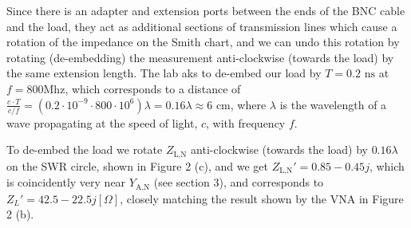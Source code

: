 \documentclass[10pt]{article}
\begin{document}
Since there is an adapter and extension ports between the ends of the BNC cable and the load, they act as 
additional sections of transmission lines which cause a rotation of the impedance on the Smith chart, and 
we can undo this rotation by rotating (de-embedding) the measurement anti-clockwise (towards the load) by the same 
extension length. The lab aks to de-embed our load by $T = 0.2 \text{ ns}$ at $f=800\text{Mhz}$, which corresponds 
to a distance of $\frac{c\cdot T}{c/f} = (0.2\cdot10^{-9}\cdot 800\cdot 10^{6}) \lambda = 0.16\lambda \approx 6\text{ cm}$, 
where $\lambda$ is the wavelength of a wave propagating at the speed of light, $c$, with frequency $f$.

To de-embed the load we rotate $Z_\text{L,N}$ anti-clockwise (towards the load) by $0.16\lambda$ on the SWR circle, 
shown in Figure 2 (c), and we get $Z_\text{L,N}' = 0.85 - 0.45j$, which is coincidently very near $Y_\text{A,N}$ 
(see section 3), and corresponds to $Z_L' = 42.5 - 22.5j [\Omega]$, closely matching the result shown by the VNA 
in Figure 2 (b).
\end{document}
